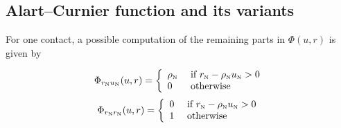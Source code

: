 \subsection{Alart--Curnier function and its variants}
\label{Sec:Phi-AC-II}

For one contact, a possible computation of the remaining parts in $\Phi(u, r)$  is given by

\begin{equation}
  \label{eq:Phi-AC-II-rnun}
   \Phi_{r_\n u_\n}(u,r) =  \left\{
   \begin{array}{ll}
     \rho_{\n} & \text{ if }  r_{\n} - \rho_{\n} u_{\n} > 0 \\
     0  & \text{ otherwise }
    \end{array}\right.
\end{equation}
\begin{equation}
  \label{eq:Phi-AC-II-rnrn}
  \Phi_{r_\n r_\n}(u,r) =
  \left\{
    \begin{array}{ll}
      0 & \text{ if }  r_{\n} - \rho_{\n} u_{\n} > 0 \\
      1  & \text{ otherwise }
    \end{array}\right.
\end{equation}

